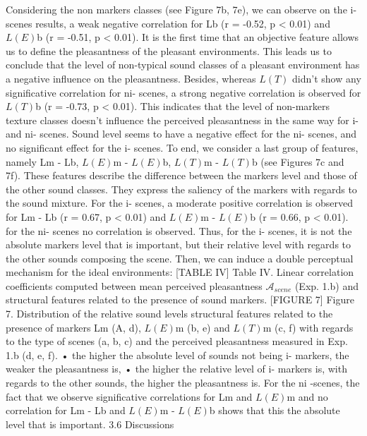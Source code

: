 Considering the non markers classes (see Figure 7b, 7e), we can observe on the i- scenes results, a weak negative correlation for Lb (r = -0.52, p < 0.01) and $L(E)$b (r = -0.51, p < 0.01). It is the first time that an objective feature allows us to define the pleasantness of the pleasant environments. This leads us to conclude that the level of non-typical sound classes of a pleasant environment has a negative influence on the pleasantness.
Besides, whereas $L(T)$ didn’t show any significative correlation for ni- scenes, a strong negative correlation is observed for $L(T)$b (r = -0.73, p < 0.01). This indicates that the level of non-markers texture classes doesn’t influence the perceived pleasantness in the same way for i- and ni- scenes. Sound level seems to have a negative effect for the ni- scenes, and no significant effect for the i- scenes.
To end, we consider a last group of features, namely Lm - Lb, $L(E)$m - $L(E)$b, $L(T)$m - $L(T)$b (see Figures 7c and 7f). These features describe the difference between the markers level and those of the other sound classes. They express the saliency of the markers with regards to the sound mixture.
For the i- scenes, a moderate positive correlation is observed for Lm - Lb (r = 0.67, p < 0.01) and $L(E)$m - $L(E)$b (r = 0.66, p < 0.01). for the ni- scenes no correlation is observed. Thus, for the i- scenes, it is not the absolute markers level that is important, but their relative level with regards to the other sounds composing the scene. Then, we can induce a double perceptual mechanism for the ideal environments:
[TABLE IV] Table IV. Linear correlation coefficients computed between mean perceived pleasantness $\mathcal{A}_{scene}$ (Exp. 1.b) and structural features related to the presence of sound markers.
[FIGURE 7] Figure 7. Distribution of the relative sound levels structural features related to the presence of markers Lm (A, d), $L(E)$m (b, e) and $L(T)$m (c, f) with regards to the type of scenes (a, b, c) and the perceived pleasantness measured in Exp. 1.b (d, e, f).
• the higher the absolute level of sounds not being i- markers, the weaker the pleasantness is, • the higher the relative level of i- markers is, with regards to the other sounds, the higher the pleasantness is.
For the ni -scenes, the fact that we observe significative correlations for Lm and $L(E)$m and no correlation for Lm - Lb and $L(E)$m - $L(E)$b shows that this the absolute level that is important.
3.6 Discussions
